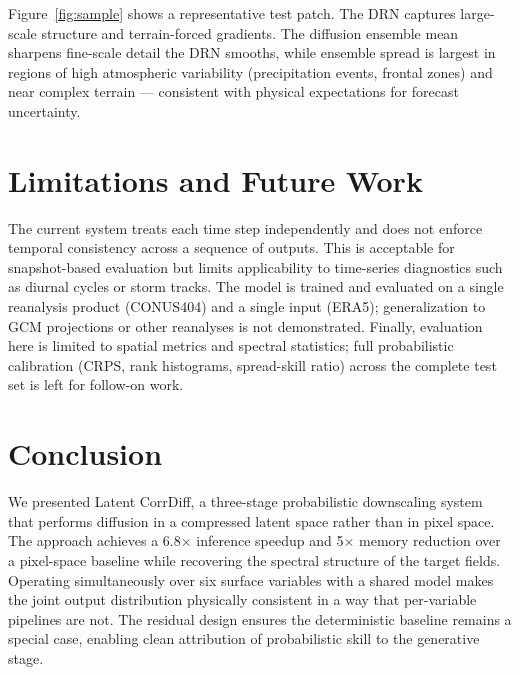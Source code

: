 \documentclass[10pt]{article}
\begin{document}
Figure~\ref{fig:sample} shows a representative test patch. The DRN captures large-scale structure and terrain-forced gradients. The diffusion ensemble mean sharpens fine-scale detail the DRN smooths, while ensemble spread is largest in regions of high atmospheric variability (precipitation events, frontal zones) and near complex terrain --- consistent with physical expectations for forecast uncertainty.

\section{Limitations and Future Work}

The current system treats each time step independently and does not enforce temporal consistency across a sequence of outputs. This is acceptable for snapshot-based evaluation but limits applicability to time-series diagnostics such as diurnal cycles or storm tracks. The model is trained and evaluated on a single reanalysis product (CONUS404) and a single input (ERA5); generalization to GCM projections or other reanalyses is not demonstrated. Finally, evaluation here is limited to spatial metrics and spectral statistics; full probabilistic calibration (CRPS, rank histograms, spread-skill ratio) across the complete test set is left for follow-on work.

\section{Conclusion}

We presented Latent CorrDiff, a three-stage probabilistic downscaling system that performs diffusion in a compressed latent space rather than in pixel space. The approach achieves a 6.8$\times$ inference speedup and 5$\times$ memory reduction over a pixel-space baseline while recovering the spectral structure of the target fields. Operating simultaneously over six surface variables with a shared model makes the joint output distribution physically consistent in a way that per-variable pipelines are not. The residual design ensures the deterministic baseline remains a special case, enabling clean attribution of probabilistic skill to the generative stage.
\end{document}
